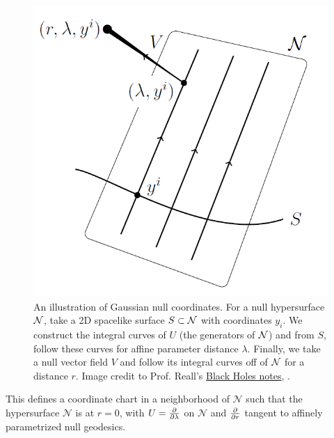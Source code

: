 \begin{figure}
    \centering
    \includegraphics{2019/02/20190220_reall_gaussiannullcoords.png}
    \caption{An illustration of Gaussian null coordinates. For a null hypersurface $\cN$, take a 2D spacelike surface $S\subset \cN$ with coordinates $y_i$. We construct the integral curves of $U$ (the generators of $\cN$) and from $S$, follow these curves for affine parameter distance $\lambda$. Finally, we take a null vector field $V$ and follow its integral curves off of $\cN$ for a distance $r$.\newline
    Image credit to Prof. Reall's  \href{http://www.damtp.cam.ac.uk/user/hsr1000/black_holes_lectures_2016.pdf}{Black Holes notes}, .
    }
    \label{fig:gaussiannullcoords}
\end{figure}

This defines a coordinate chart in a neighborhood of $\mathcal{N}$ such that the hypersurface $\mathcal{N}$ is at $r=0$, with $U=\P{}{\lambda}$ on $\mathcal{N}$ and $\P{}{r}$ tangent to affinely parametrized null geodesics.

